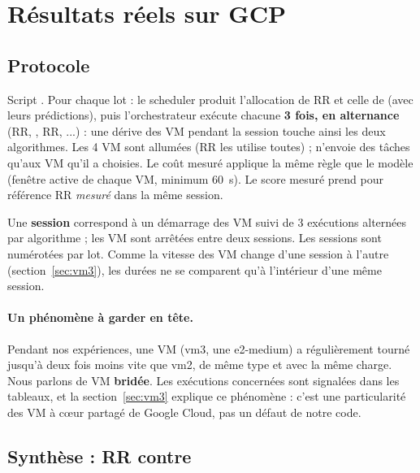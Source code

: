 \section{Résultats réels sur GCP}
\label{sec:reels}

\begin{center}
\end{center}

\subsection{Protocole}

Script . Pour chaque lot : le scheduler produit
l'allocation de RR et celle de \sel{} (avec leurs prédictions), puis
l'orchestrateur exécute chacune \textbf{3 fois, en alternance} (RR, \sel, RR,
\sel...) : une dérive des VM pendant la session touche ainsi les deux algorithmes.
Les 4 VM sont allumées (RR les utilise toutes) ; \sel{} n'envoie des tâches qu'aux
VM qu'il a choisies. Le coût mesuré applique la même règle que le modèle (fenêtre
active de chaque VM, minimum 60~s). Le score mesuré prend pour référence RR
\emph{mesuré} dans la même session.

Une \textbf{session} correspond à un démarrage des VM suivi de 3 exécutions
alternées par algorithme ; les VM sont arrêtées entre deux sessions. Les sessions
sont numérotées par lot. Comme la vitesse des VM change d'une session à l'autre
(section~\ref{sec:vm3}), les durées ne se comparent qu'à l'intérieur d'une même
session.

\paragraph{Un phénomène à garder en tête.} Pendant nos expériences, une VM
(vm3, une e2-medium) a régulièrement tourné jusqu'à deux fois moins vite que vm2,
de même type et avec la même charge. Nous parlons de VM \textbf{bridée}. Les
exécutions concernées sont signalées dans les tableaux, et la
section~\ref{sec:vm3} explique ce phénomène : c'est une particularité des VM à
cœur partagé de Google Cloud, pas un défaut de notre code.

\subsection{Synthèse : RR contre \sel{}}

